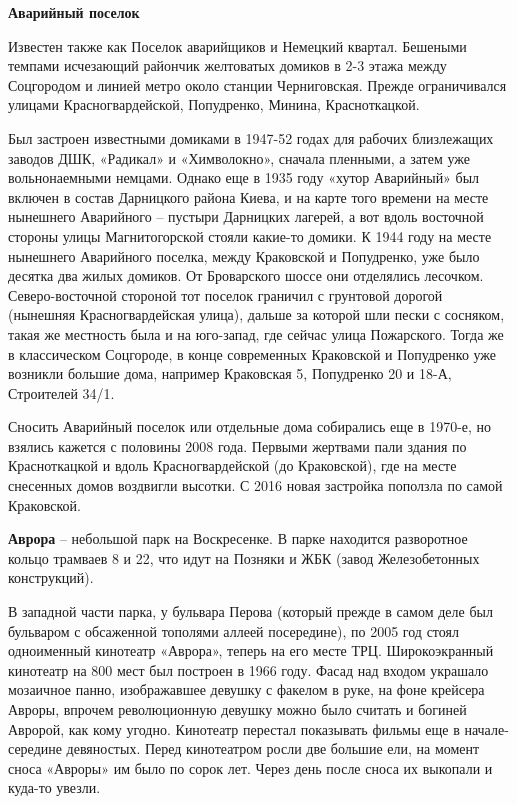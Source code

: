 \medskip

\newpage

\textbf{Аварийный поселок}

Известен также как Поселок аварийщиков и Немецкий квартал. Бешеными темпами исчезающий райончик желтоватых домиков в 2-3 этажа между Соцгородом и линией метро около станции Черниговская. Прежде ограничивался улицами Красногвардейской, Попудренко, Минина, Красноткацкой. 

Был застроен известными домиками в 1947-52 годах для рабочих близлежащих заводов ДШК, «Радикал» и «Химволокно», сначала пленными, а затем уже вольнонаемными немцами. Однако еще в 1935 году «хутор Аварийный» был включен в состав Дарницкого района Киева, и на карте того времени на месте нынешнего Аварийного – пустыри Дарницких лагерей, а вот вдоль восточной стороны улицы Магнитогорской стояли какие-то домики. К 1944 году на месте нынешнего Аварийного поселка, между Краковской и Попудренко, уже было десятка два жилых домиков. От Броварского шоссе они отделялись лесочком. Северо-восточной стороной тот поселок граничил с грунтовой дорогой (нынешняя Красногвардейская улица), дальше за которой шли пески с сосняком, такая же местность была и на юго-запад, где сейчас улица Пожарского. Тогда же в классическом Соцгороде, в конце современных Краковской и Попудренко уже возникли большие дома, например Краковская 5, Попудренко 20 и 18-А, Строителей 34/1.

Сносить Аварийный поселок или отдельные дома собирались еще в 1970-е, но взялись кажется с половины 2008 года. Первыми жертвами пали здания по Красноткацкой и вдоль Красногвардейской (до Краковской), где на месте снесенных домов воздвигли высотки. С 2016 новая застройка поползла по самой Краковской.\\

\medskip

\textbf{Аврора} – небольшой парк на Воскресенке. В парке находится разворотное кольцо трамваев 8 и 22, что идут на Позняки и ЖБК (завод Железобетонных конструкций).

В западной части парка, у бульвара Перова (который прежде в самом деле был бульваром с обсаженной тополями аллеей посередине), по 2005 год стоял одноименный кинотеатр «Аврора», теперь на его месте ТРЦ. Широкоэкранный кинотеатр на 800 мест был построен в 1966 году. Фасад над входом украшало мозаичное панно, изображавшее девушку с факелом в руке, на фоне крейсера Авроры, впрочем революционную девушку можно было считать и богиней Авророй, как кому угодно. Кинотеатр перестал показывать фильмы еще в начале-середине девяностых. Перед кинотеатром росли две большие ели, на момент сноса «Авроры» им было по сорок лет. Через день после сноса их выкопали и куда-то увезли.

